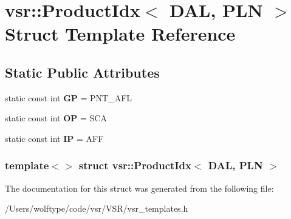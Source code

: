 \hypertarget{structvsr_1_1_product_idx_3_01_d_a_l_00_01_p_l_n_01_4}{\section{vsr\-:\-:Product\-Idx$<$ D\-A\-L, P\-L\-N $>$ Struct Template Reference}
\label{structvsr_1_1_product_idx_3_01_d_a_l_00_01_p_l_n_01_4}
}
\subsection*{Static Public Attributes}
\begin{DoxyCompactItemize}
\item 
\hypertarget{structvsr_1_1_product_idx_3_01_d_a_l_00_01_p_l_n_01_4_ad9592d0f20e93d10161a3a0c89664fba}{static const int {\bfseries G\-P} = P\-N\-T\-\_\-\-A\-F\-L}\label{structvsr_1_1_product_idx_3_01_d_a_l_00_01_p_l_n_01_4_ad9592d0f20e93d10161a3a0c89664fba}

\item 
\hypertarget{structvsr_1_1_product_idx_3_01_d_a_l_00_01_p_l_n_01_4_a505a7135b33e452339a607510ad49225}{static const int {\bfseries O\-P} = S\-C\-A}\label{structvsr_1_1_product_idx_3_01_d_a_l_00_01_p_l_n_01_4_a505a7135b33e452339a607510ad49225}

\item 
\hypertarget{structvsr_1_1_product_idx_3_01_d_a_l_00_01_p_l_n_01_4_aaa09c71e95e89dddf78feb5252b6926a}{static const int {\bfseries I\-P} = A\-F\-F}\label{structvsr_1_1_product_idx_3_01_d_a_l_00_01_p_l_n_01_4_aaa09c71e95e89dddf78feb5252b6926a}

\end{DoxyCompactItemize}
\subsubsection*{template$<$$>$ struct vsr\-::\-Product\-Idx$<$ D\-A\-L, P\-L\-N $>$}



The documentation for this struct was generated from the following file\-:\begin{DoxyCompactItemize}
\item 
/\-Users/wolftype/code/vsr/\-V\-S\-R/vsr\-\_\-templates.\-h\end{DoxyCompactItemize}
